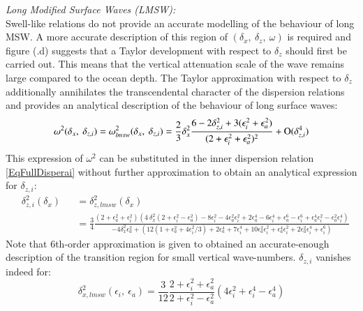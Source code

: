 \documentclass[a4paper,11pt]{article}
\begin{document}
\textit{Long Modified Surface Waves (LMSW):}\\
Swell-like relations do not provide an accurate modelling of the behaviour of long MSW. A more accurate description of this region of $(\delta_x,\ \delta_z,\ \omega)$ is required and figure (.d) suggests that a Taylor development with respect to $\delta_z$ should first be carried out. This means that the vertical attenuation scale of the wave remains large compared to the ocean depth. The Taylor approximation with respect to $\delta_z$ additionally annihilates the transcendental character of the dispersion relations and provides an analytical description of the behaviour of long surface waves:
\begin{equation}
	\label{Eqxxx}
     \omega^2(\delta_x,\ \delta_{z,i}) = 
     \omega_{lmsw}^2(\delta_x,\ \delta_{z,i}) = \frac{2}{3}\delta_x^2 
 		\frac{6-2\delta_{z,i}^2+3(\epsilon_i^2+\epsilon_a^2)}
 		{(2+\epsilon_i^2+\epsilon_a^2)^2}
 		+ \mathrm{O}(\delta_{z,i}^4)\\[3mm]
\end{equation}
This expression of $\omega^2$ can be substituted in the inner dispersion relation \ref{EqFullDisperai} without further approximation to obtain an analytical expression for $\delta_{z,i}$:
\begin{subequations}
	\begin{alignat}{2}
 		& \delta_{z,i}^2(\delta_x) &&=\delta_{z,lmsw}^2(\delta_x)\\[3mm]
		\label{EqDispDeltaz0}
 		& &&=\frac{3}{4}
 		\frac{
 		(2+\epsilon_a^2+\epsilon_i^2)
 		\left(
 		4\ \delta_x^2(2+\epsilon_i^2-\epsilon_a^2)
 		-8\epsilon_i^2-4\epsilon_a^2\epsilon_i^2
 		+2\epsilon_a^4-6\epsilon_i^4
 		+\epsilon_a^6-\epsilon_i^6
 		+\epsilon_a^4\epsilon_i^2
 		-\epsilon_a^2\epsilon_i^4
 		\right)
 		}
 		{-4\delta_x^2\epsilon_a^2
 		+\left(12(1+\epsilon_a^2+4\epsilon_i^2/3)
 		+2\epsilon_a^4+7\epsilon_i^4
 		+10\epsilon_a^2\epsilon_i^2
 		+\epsilon_a^4\epsilon_i^2
 		+2\epsilon_a^2\epsilon_i^4
 		+\epsilon_i^6 \right)
 		}
 	\end{alignat}
\end{subequations}
Note that 6th-order approximation is given to obtained an accurate-enough description of the transition region for small vertical wave-numbers. $\delta_{z,i}$ vanishes indeed for:
\begin{equation}
	\label{EqDispDeltazLim0}
	\delta_{x,lmsw}^2(\epsilon_i,\ \epsilon_a)=
	\frac{3}{12}
	\frac{2+\epsilon_i^2+\epsilon_a^2}
	{2+\epsilon_i^2-\epsilon_a^2}
	\left(4\epsilon_i^2+\epsilon_i^4-\epsilon_a^4\right)
\end{equation}
\end{document}
